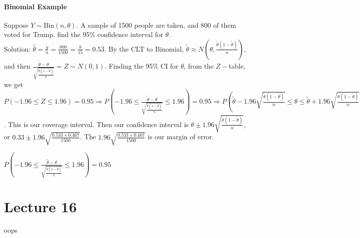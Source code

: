 \documentclass[10pt,letter]{article}
\theoremstyle{plain}
\theoremstyle{definition}
\begin{document}
\paragraph{Binomial Example}
Suppose $Y\sim\text{Bin}(n,\theta)$. A sample of 1500 people are taken, and 800 of them voted for Trump. find the 95\% confidence interval for $\theta$. \\ 
Solution: $\hat{\theta}=\frac{y}{n}=\frac{800}{1500}=\frac{8}{15}=0.5\overline{3}$. By the CLT to Binomial, $\tilde{\theta}\approx N\left(\theta,\frac{\tilde\theta(1-\tilde\theta)}{n}\right)$, and then $\frac{\tilde{\theta}-\theta}{\sqrt{\frac{\tilde{\theta}(1-\tilde{\theta})}{n}}}=Z\sim N(0,1)$. Finding the 95\% CI for $\theta$, from the $Z-$table, we get $P(-1.96\leq Z\leq1.96)=0.95\Rightarrow P\left(-1.96\leq\frac{\tilde{\theta}-\theta}{\sqrt{\frac{\tilde{\theta}(1-\tilde{\theta})}{n}}}\leq1.96\right)=0.95\Rightarrow P\left(\tilde{\theta}-1.96\sqrt{\frac{\tilde{\theta}(1-\tilde{\theta})}{n}}\leq\theta\leq\tilde{\theta}+1.96\sqrt{\frac{\tilde{\theta}(1-\tilde{\theta})}{n}}\right)=0.95$. This is our coverage interval. Then our confidence interval is $\theta\pm1.96\sqrt{\frac{\tilde{\theta}(1-\tilde{\theta})}{n}}$, or $0.33\pm1.96\sqrt{\frac{0.533\times0.467}{1500}}$. The $1.96\sqrt{\frac{0.533\times0.467}{1500}}$ is our margin of error.

$P\left(-1.96\leq\frac{\tilde{\theta}-\theta}{\sqrt{\frac{\tilde{\theta}(1-\tilde{\theta})}{n}}}\leq1.96\right)=0.95$

\section*{Lecture 16}
oops 
\end{document}
